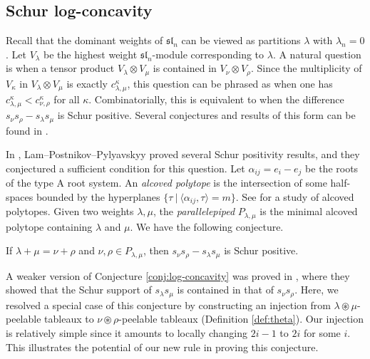 \documentclass[ALCO,Unicode]{cedram}
\newcommand{\ssl}{\mathfrak{sl}}
\begin{document}
\subsection{Schur log-concavity}\label{subsec:intro-log}

    Recall that the dominant weights of $\ssl_n$ can be viewed as partitions $\lambda$ with $\lambda_n = 0$. Let $V_\lambda$ be the highest weight $\ssl_n$-module corresponding to $\lambda$. A natural question is when a tensor product $V_{\lambda}\otimes V_\mu$ is contained in $V_{\nu}\otimes V_\rho$. Since the multiplicity of $V_{\kappa}$ in $V_{\lambda}\otimes V_\mu$ is exactly $c_{\lambda,\mu}^\kappa$, this question can be phrased as when one has $c_{\lambda,\mu}^\kappa < c_{\nu,\rho}^\kappa$ for all $\kappa$. Combinatorially, this is equivalent to when the difference $s_{\nu}s_\rho - s_{\lambda}s_\mu$ is Schur positive. Several  conjectures and results of this form can be found in \cite{bergeron2004some,fomin2005eigenvalues,lascoux1997ribbon, okounkov1997log}.

    In \cite{lam2007schur}, Lam--Postnikov--Pylyavskyy proved several Schur positivity results, and they conjectured a sufficient condition for this question. Let $\alpha_{ij} = e_i-e_j$ be the roots of the type A root system. An \textit{alcoved polytope} is the intersection of some half-spaces bounded by the hyperplanes $\{\tau~|~\langle \alpha_{ij},\tau\rangle = m\}$. See \cite{lam2007alcoved,lam2018alcoved} for a study of alcoved polytopes. Given two weights $\lambda,\mu$, the \textit{parallelepiped} $P_{\lambda,\mu}$ is the minimal alcoved polytope containing $\lambda$ and $\mu$. We have the following conjecture.

    \begin{conjecture}\label{conj:log-concavity}
        If $\lambda + \mu = \nu + \rho$ and $\nu,\rho\in P_{\lambda,\mu}$, then $s_{\nu}s_\rho - s_{\lambda}s_\mu$ is Schur positive.
    \end{conjecture}

    A weaker version of Conjecture \ref{conj:log-concavity} was proved in \cite{dobrovolska2007products}, where they showed that the Schur support of $s_{\lambda}s_\mu$ is contained in that of $s_{\nu}s_\rho$. Here, we resolved a special case of this conjecture by constructing an injection from $\lambda\circledast\mu$-peelable tableaux to $\nu\circledast\rho$-peelable tableaux (Definition \ref{def:theta}). Our injection is relatively simple since it amounts to locally changing $2i-1$ to $2i$ for some $i$. This illustrates the potential of our new rule in proving this conjecture.
\end{document}
